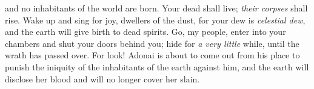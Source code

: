 \begin{biblechapter}
and no inhabitants of the world are born.
\verse Your dead shall live; \textit{their corpses} shall rise. 
Wake up and sing for joy, dwellers of the dust, 
for your dew is \textit{celestial dew}, 
and the earth will give birth to dead spirits.
\verse Go, my people, enter into your chambers 
and shut your doors behind you; 
hide for \textit{a very little} while, 
until the wrath has passed over.
\verse For look! Adonai is about to come out from his place 
to punish the iniquity of the inhabitants of the earth against him, 
and the earth will disclose her blood 
and will no longer cover her slain.
\end{biblechapter}

